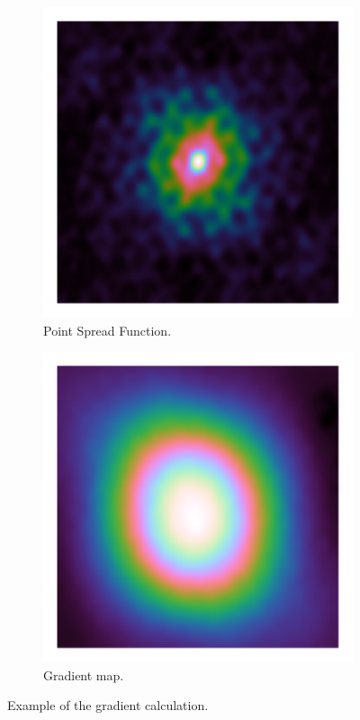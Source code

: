 \begin{figure}[h]
\begin{subfigure}[b]{0.3\linewidth}
		\includegraphics[width=\linewidth, clip, trim= 0.25in 0.25in 0.25in 0.25in]{./chapters/03.cd/simulated/psf.png}
		\caption{Point Spread Function.}
		\label{cd:efficient:gradients:psf}
	\end{subfigure}
	\begin{subfigure}[b]{0.3\linewidth}
		\includegraphics[width=\linewidth, clip, trim= 0.25in 0.25in 0.25in 0.25in]{./chapters/03.cd/simulated/gradients.png}
		\caption{Gradient map.}
		\label{cd:efficient:gradients:gradients}
	\end{subfigure}
	
	\caption{Example of the gradient calculation.}
	\label{cd:efficient:gradients:figure}
\end{figure}


